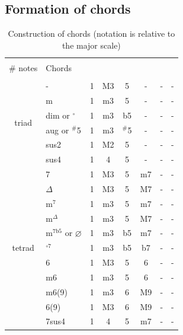 \documentclass{article}
\begin{document}
\subsection{Formation of chords}
\begin{table}[!h]
	\centering
	\caption{Construction of chords (notation is relative to the major scale)}
	\begin{tabular}{clcccccc}
		\hline \vspace{-0.2cm} \\
		$\#$ notes & Chords & & & & & &\\
		\hline \vspace{-0.2cm} \\ 
		\multirow{6}{*}{triad} & -        & 1 & M3 & 5 &  -  & -  & -\\
		                       & m        & 1 & m3 & 5 &  -  & -  & -\\
		                       & dim or $^\circ$  & 1 & m3 & b5  &  -  & -  & -\\
		                       & aug or $^\#$5 & 1 & m3 & $^\#$5 &  -  & -  & -\\
		                       & sus2     & 1 & M2  & 5     &  -  & -  & -\\
		                       & sus4     & 1 & 4   & 5     &  -  & -  & -\\
		\hline  
		\multirow{13}{*}{tetrad}& 7        & 1 & M3  & 5 & m7  & -  & -\\
		                       & $\Delta$  & 1 & M3  & 5 & M7  & -  & -\\
		                       & m$^7$     & 1 & m3  & 5 & m7  & -  & -\\
		                       & m$^\Delta$& 1 & m3  & 5 & M7  & -  & -\\
		                       & m$^{7\textrm{b}5}$ or $\varnothing$& 1 & m3  & b5 & m7  & -  & -\\
		                       & $^{\circ 7}$   & 1 & m3  & b5 & b7 & -  & -\\
                               & 6        & 1 & M3  & 5 & 6   & -  & -\\	
                               & m6       & 1 & m3  & 5 & 6   & -  & -\\	                       
		                       & m6(9)    & 1 & m3  & 6 & M9  & -  & -\\
		                       & 6(9)     & 1 & M3  & 6 & M9  & -  & -\\
		                       & 7sus4    & 1 & 4   & 5 & m7  & -  & -\\

\end{tabular}
\end{table}
\end{document}
